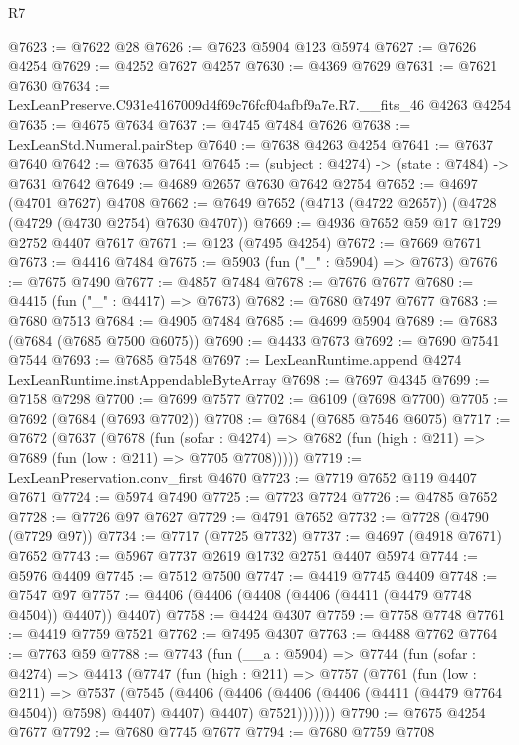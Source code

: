 \begin{lexlean}{R7}
\begin{coremodule}
@7623 := @7622 @28
@7626 := @7623 @5904 @123 @5974
@7627 := @7626 @4254
@7629 := @4252 @7627 @4257
@7630 := @4369 @7629
@7631 := @7621 @7630
@7634 := LexLeanPreserve.C931e4167009d4f69c76fcf04afbf9a7e.R7.__fits_46 @4263 @4254
@7635 := @4675 @7634
@7637 := @4745 @7484 @7626
@7638 := LexLeanStd.Numeral.pairStep
@7640 := @7638 @4263 @4254
@7641 := @7637 @7640
@7642 := @7635 @7641
@7645 := (subject : @4274) -> (state : @7484) -> @7631 @7642
@7649 := @4689 @2657 @7630 @7642 @2754
@7652 := @4697 (@4701 @7627) @4708
@7662 := @7649 @7652 (@4713 (@4722 @2657)) (@4728 (@4729 (@4730 @2754) @7630 @4707))
@7669 := @4936 @7652 @59 @17 @1729 @2752 @4407 @7617
@7671 := @123 (@7495 @4254)
@7672 := @7669 @7671
@7673 := @4416 @7484
@7675 := @5903 (fun ("_" : @5904) => @7673)
@7676 := @7675 @7490
@7677 := @4857 @7484
@7678 := @7676 @7677
@7680 := @4415 (fun ("_" : @4417) => @7673)
@7682 := @7680 @7497 @7677
@7683 := @7680 @7513
@7684 := @4905 @7484
@7685 := @4699 @5904
@7689 := @7683 (@7684 (@7685 @7500 @6075))
@7690 := @4433 @7673
@7692 := @7690 @7541 @7544
@7693 := @7685 @7548
@7697 := LexLeanRuntime.append @4274 LexLeanRuntime.instAppendableByteArray
@7698 := @7697 @4345
@7699 := @7158 @7298
@7700 := @7699 @7577
@7702 := @6109 (@7698 @7700)
@7705 := @7692 (@7684 (@7693 @7702))
@7708 := @7684 (@7685 @7546 @6075)
@7717 := @7672
    (@7637
      (@7678
        (fun (sofar : @4274) =>
        @7682 (fun (high : @211) => @7689 (fun (low : @211) => @7705 @7708)))))
@7719 := LexLeanPreservation.conv_first @4670
@7723 := @7719 @7652 @119 @4407 @7671
@7724 := @5974 @7490
@7725 := @7723 @7724
@7726 := @4785 @7652
@7728 := @7726 @97 @7627
@7729 := @4791 @7652
@7732 := @7728 (@4790 (@7729 @97))
@7734 := @7717 (@7725 @7732)
@7737 := @4697 (@4918 @7671) @7652
@7743 := @5967 @7737 @2619 @1732 @2751 @4407 @5974
@7744 := @5976 @4409
@7745 := @7512 @7500
@7747 := @4419 @7745 @4409
@7748 := @7547 @97
@7757 := @4406 (@4406 (@4408 (@4406 (@4411 (@4479 @7748 @4504)) @4407)) @4407)
@7758 := @4424 @4307
@7759 := @7758 @7748
@7761 := @4419 @7759 @7521
@7762 := @7495 @4307
@7763 := @4488 @7762
@7764 := @7763 @59
@7788 := @7743
    (fun (__a : @5904) =>
    @7744
      (fun (sofar : @4274) =>
      @4413
        (@7747
          (fun (high : @211) =>
          @7757
            (@7761
              (fun (low : @211) =>
              @7537
                (@7545
                  (@4406
                    (@4406 (@4406 (@4406 (@4411 (@4479 @7764 @4504)) @7598) @4407) @4407)
                    @4407)
                  @7521)))))))
@7790 := @7675 @4254 @7677
@7792 := @7680 @7745 @7677
@7794 := @7680 @7759 @7708

\end{coremodule}
\end{lexlean}
